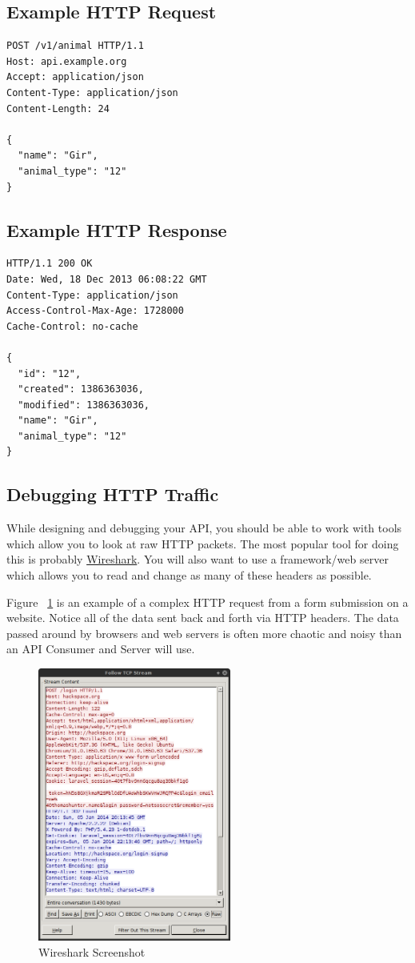 \documentclass{book}
\begin{document}
\subsection{Example HTTP Request}

\begin{verbatim}
POST /v1/animal HTTP/1.1
Host: api.example.org
Accept: application/json
Content-Type: application/json
Content-Length: 24

{
  "name": "Gir",
  "animal_type": "12"
}
\end{verbatim}

\subsection{Example HTTP Response}

\begin{verbatim}
HTTP/1.1 200 OK
Date: Wed, 18 Dec 2013 06:08:22 GMT
Content-Type: application/json
Access-Control-Max-Age: 1728000
Cache-Control: no-cache

{
  "id": "12",
  "created": 1386363036,
  "modified": 1386363036,
  "name": "Gir",
  "animal_type": "12"
}
\end{verbatim}

\subsection{Debugging HTTP Traffic}

While designing and debugging your API, you should be able to work with tools which allow you to look at raw HTTP packets. The most popular tool for doing this is probably \href{https://www.wireshark.org}{Wireshark}. You will also want to use a framework/web server which allows you to read and change as many of these headers as possible.

Figure ~\ref{fig:wireshark} is an example of a complex HTTP request from a form submission on a website. Notice all of the data sent back and forth via HTTP headers. The data passed around by browsers and web servers is often more chaotic and noisy than an API Consumer and Server will use.

\begin{figure}[ht!]
\centering
\includegraphics[height=90mm]{images/wireshark.png}
\caption{Wireshark Screenshot}
\label{fig:wireshark}
\end{figure}
\end{document}

